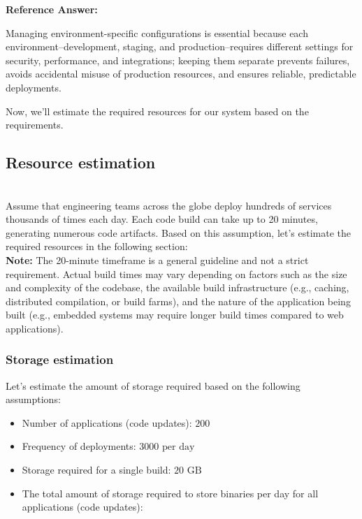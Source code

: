 \textbf{Reference Answer:}

Managing environment-specific configurations is essential because each environment--development, staging, and production--requires different settings for security, performance, and integrations; keeping them separate prevents failures, avoids accidental misuse of production resources, and ensures reliable, predictable deployments.

Now, we'll estimate the required resources for our system based on the requirements.

\subsection{Resource estimation}\label{cRli8oFxo0HIcWgiyLN2d}
\\
Assume that engineering teams across the globe deploy hundreds of services thousands of times each day. Each code build can take up to 20 minutes, generating numerous code artifacts. Based on this assumption, let's estimate the required resources in the following section:
\\
\textbf{Note:} The 20-minute timeframe is a general guideline and not a strict requirement. Actual build times may vary depending on factors such as the size and complexity of the codebase, the available build infrastructure (e.g., caching, distributed compilation, or build farms), and the nature of the application being built (e.g., embedded systems may require longer build times compared to web applications).

\subsubsection{Storage estimation}\label{GDigm1scJOGflejl-MHyw}

Let's estimate the amount of storage required based on the following assumptions:

\begin{itemize}
\item
\protect{}\label{PzmDKc3z94AuyeMZ4yk9p}
Number of applications (code updates): \protect{}\label{katex_inline_mNyJ3MLj642JKbvVdFFbf}{{{\(200 \)}}}
\item
\protect{}\label{0oSir6GsHjzdX-ZZ5rDwi}
Frequency of deployments: \protect{}\label{katex_inline_G9iUu27afZ_ptwZh_u9lW}{{{\(3000 \text{ per day}\)}}}
\item
\protect{}\label{yguo01SD8vkz7Vraqf53m}
Storage required for a single build: \protect{}\label{katex_inline_Q4h_uY2orPioEsgLQ-p9y}{{{\(20 \text{ GB}\)}}}
\item
\protect{}\label{LheP1au-KecktfeEtHJRx}
The total amount of storage required to store binaries per day for all applications (code updates):
\end{itemize}


